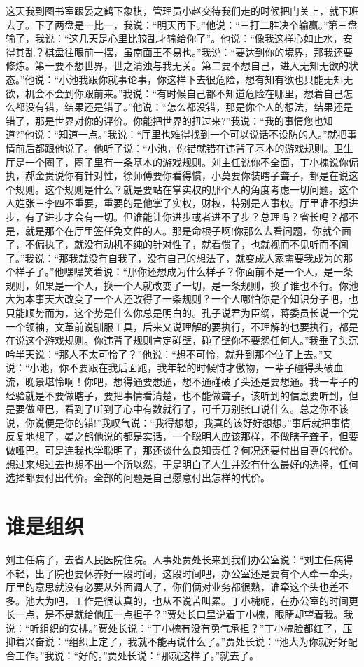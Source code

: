 \documentclass[12pt,oneside]{book}
\begin{document}
这天我到图书室跟晏之鹤下象棋，管理员小赵交待我们走的时候把门关上，就下班去了。下了两盘是一比一，我说：``明天再下。''他说：``三打二胜决个输赢。''第三盘输了，我说：``这几天是心里比较乱才输给你了''。他说：``像我这样心如止水，安得其乱？棋盘往眼前一摆，虽南面王不易也。''我说：``要达到你的境界，那我还要修炼。第一要不想世界，世之清浊与我无关。第二要不想自己，进入无知无欲的状态。''他说：``小池我跟你就事论事，你这样下去很危险，想有知有欲也只能无知无欲，机会不会到你跟前来。''我说：``有时候自己都不知道危险在哪里，想着自己怎么都没有错，结果还是错了。''他说：``怎么都没错，那是你个人的想法，结果还是错了，那是世界对你的评价。你能把世界的扭过来?''我说：``我的事情您也知道?''他说：``知道一点。''我说：``厅里也难得找到一个可以说话不设防的人。''就把事情前后都跟他说了。他听了说：``小池，你错就错在违背了基本的游戏规则。卫生厅是一个圈子，圈子里有一条基本的游戏规则。刘主任说你不全面，丁小槐说你偏执，郝金贵说你有针对性，徐师傅要你看得惯，小莫要你装瞎子聋子，都是在说这个规则。这个规则是什么？就是要站在掌实权的那个人的角度考虑一切问题。这个人姓张三李四不重要，重要的是他掌了实权，财权，特别是人事权。厅里谁不想进步，有了进步才会有一切。但谁能让你进步或者进不了步？总理吗？省长吗？都不是，就是那个在厅里签任免文件的人。那是命根子啊!你那么去看问题，你就全面了，不偏执了，就没有动机不纯的针对性了，就看惯了，也就视而不见听而不闻了。''我说：``那我就没有自我了，没有自己的想法了，就变成人家需要我成为的那个样子了。''他嘿嘿笑着说：``那你还想成为什么样子？你面前不是一个人，是一条规则，如果是一个人，换一个人就改变了一切，是一条规则，换了谁也不行。你池大为本事天大改变了一个人还改得了一条规则？一个人哪怕你是个知识分子吧，也只能顺势而为，这个势是什么你总是明白的。孔子说君为臣纲，蒋委员长说一个党一个领袖，文革前说驯服工具，后来又说理解的要执行，不理解的也要执行，都是在说这个游戏规则。你违背了规则肯定碰壁，碰了壁你不要怨任何人。''我垂了头沉吟半天说：``那人不太可怜了？''他说：``想不可怜，就升到那个位子上去。''又说：``小池，你不要跟在我后面跑，我年轻的时候恃才傲物，一辈子碰得头破血流，晚景堪怜啊！你吧，想得通要想通，想不通碰破了头还是要想通。我一辈子的经验就是不要做瞎子，要把事情看清楚，也不能做聋子，该听到的信息要听到，但是要做哑巴，看到了听到了心中有数就行了，可千万别张口说什么。总之你不该说，你说便是你的错!''我叹气说：``我得想想，我真的该好好想想。''事后就把事情反复地想了，晏之鹤他说的都是实话，一个聪明人应该那样，不做瞎子聋子，但要做哑巴。可是连我也学聪明了，那还谈什么良知责任？何况还要付出自尊的代价。想过来想过去也想不出一个所以然，于是明白了人生并没有什么最好的选择，任何选择都要付出代价。全部的问题是自己愿意付出怎样的代价。


\chapter{谁是组织}
刘主任病了，去省人民医院住院。人事处贾处长来到我们办公室说：``刘主任病得不轻，出了院也要休养好一段时间，这段时间吧，办公室还是要有个人牵一牵头，厅里的意思就没有必要从外面调人了，你们俩对业务都很熟，谁牵这个头也差不多。池大为吧，工作是很认真的，也从不说苦叫累。丁小槐呢，在办公室的时间更长一点，是不是就给他压一点担子？''贾处长口里说着丁小槐，眼睛却望着我。我说：``听组织的安排。''贾处长说：``丁小槐有没有勇气承担？''丁小槐脸都红了，压抑着兴奋说：``组织上定了，我就不能再说什么了。''贾处长说：``池大为你就好好配合工作。''我说：``好的。''贾处长说：``那就这样了。''就去了。
\end{document}
